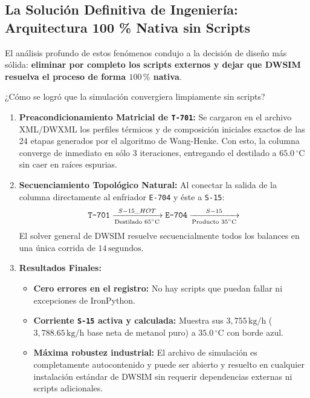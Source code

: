 \documentclass[11pt,a4paper]{article}
\begin{document}
\subsection{La Solución Definitiva de Ingeniería: Arquitectura 100 \% Nativa sin Scripts}
El análisis profundo de estos fenómenos condujo a la decisión de diseño más sólida: \textbf{eliminar por completo los scripts externos y dejar que DWSIM resuelva el proceso de forma $100\,\%$ nativa}.

¿Cómo se logró que la simulación convergiera limpiamente sin scripts?
\begin{enumerate}
    \item \textbf{Preacondicionamiento Matricial de \texttt{T-701}:} Se cargaron en el archivo XML/DWXML los perfiles térmicos y de composición iniciales exactos de las 24 etapas generados por el algoritmo de Wang-Henke. Con esto, la columna converge de inmediato en sólo 3 iteraciones, entregando el destilado a $65.0\,^\circ\text{C}$ sin caer en raíces espurias.
    \item \textbf{Secuenciamiento Topológico Natural:} Al conectar la salida de la columna directamente al enfriador \texttt{E-704} y éste a \texttt{S-15}:
    \begin{equation*}
        \text{\texttt{T-701}} \xrightarrow[\text{Destilado $65^\circ\text{C}$}]{S-15\_HOT} \text{\texttt{E-704}} \xrightarrow[\text{Producto $35^\circ\text{C}$}]{S-15}
    \end{equation*}
    El solver general de DWSIM resuelve secuencialmente todos los balances en una única corrida de $14\,\text{segundos}$.
    \item \textbf{Resultados Finales:}
    \begin{itemize}
        \item \textbf{Cero errores en el registro:} No hay scripts que puedan fallar ni excepciones de IronPython.
        \item \textbf{Corriente \texttt{S-15} activa y calculada:} Muestra sus $3{,}755\,\text{kg/h}$ ($3{,}788.65\,\text{kg/h}$ base neta de metanol puro) a $35.0\,^\circ\text{C}$ con borde azul.
        \item \textbf{Máxima robustez industrial:} El archivo de simulación es completamente autocontenido y puede ser abierto y resuelto en cualquier instalación estándar de DWSIM sin requerir dependencias externas ni scripts adicionales.
    \end{itemize}
\end{enumerate}

\end{document}
